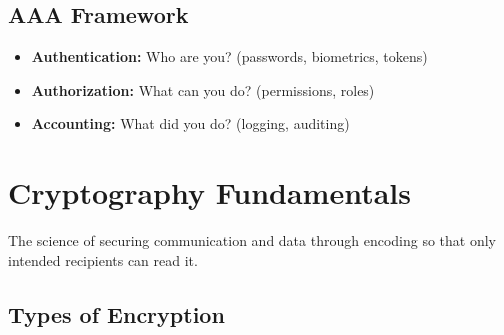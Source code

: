 \documentclass[11pt,a4paper]{article}
\begin{document}
\subsection{AAA Framework}
\begin{itemize}[leftmargin=*]
  \item \textbf{Authentication:} Who are you? (passwords, biometrics, tokens)
  \item \textbf{Authorization:} What can you do? (permissions, roles)
  \item \textbf{Accounting:} What did you do? (logging, auditing)
\end{itemize}

\section{Cryptography Fundamentals}

\begin{definitionbox}[Cryptography]
The science of securing communication and data through encoding so that only intended recipients can read it.
\end{definitionbox}

\subsection{Types of Encryption}
\end{document}

